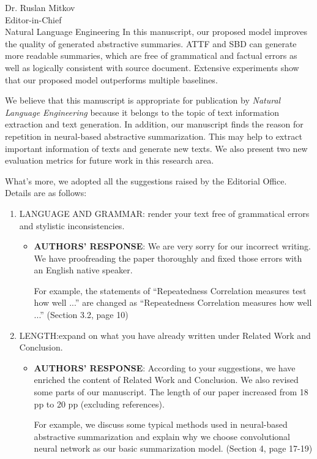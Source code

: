 \documentclass[11pt]{letter} %
\begin{document}
\begin{letter}{Dr. Ruslan Mitkov \\
Editor-in-Chief  \\
Natural Language Engineering}
In this manuscript, our proposed model improves the quality of generated abstractive summaries.
ATTF and SBD can generate more readable summaries, which are free of grammatical and factual errors
as well as logically consistent with source document.
Extensive experiments show that our proposed model outperforms multiple baselines.
 
We believe that this manuscript is appropriate for publication by
\textit{Natural Language Engineering}
because it belongs to the topic of text information extraction and text generation. 
In addition, our manuscript finds the reason for repetition in neural-based abstractive summarization.
This may help to extract important information of texts and generate new texts.
We also present two new evaluation metrics for future work in this research area.

What's more, we adopted all the suggestions raised by the Editorial Office. Details are as follows:
\begin{enumerate}
   \item LANGUAGE AND GRAMMAR: render your text free of grammatical errors and stylistic inconsistencies.
   \begin{itemize}
				\item[] \textbf{AUTHORS' RESPONSE}: 
				We are very sorry for our incorrect writing.
				We have proofreading the paper thoroughly and fixed those errors with an English native speaker.

                \hspace*{0.6cm}
				For example,
				the statements of 
				``Repeatedness Correlation measures test how well ...'' 
				are changed as
				``Repeatedness Correlation measures how well ...''
				(Section 3.2, page 10)
   \end{itemize}
   \item LENGTH:expand on what you have already written under Related Work and Conclusion.
   \begin{itemize}
				\item[] \textbf{AUTHORS' RESPONSE}: 
				According to your suggestions, we have enriched the content of Related Work and Conclusion. We also revised some parts of our manuscript. The length of our paper increased from 18 pp to 20 pp (excluding references).

                \hspace*{0.6cm}
				For example, we discuss some typical methods used in neural-based abstractive summarization and explain why we choose convolutional neural network as our basic summarization model. 
				(Section 4, page 17-19)
   \end{itemize}
\end{enumerate}


\end{letter}
\end{document}
